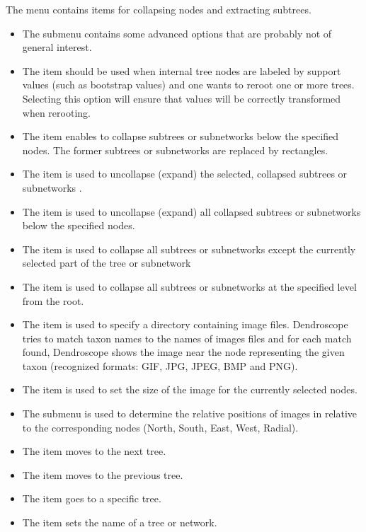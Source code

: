 \documentclass[11pt]{article}
\newcommand{\cs}[1]{\textcolor{red}{#1}}
\begin{document}
The  menu contains items for collapsing nodes and extracting subtrees.
\begin{itemize}
\item The  submenu contains some advanced options that are probably not
of general interest.
\item The  item
should be used when internal tree nodes are labeled by support values (such as bootstrap values) and one wants to reroot one or more trees.
Selecting this option will ensure that values will be correctly transformed
when rerooting. 
\item The  item enables to collapse subtrees or subnetworks below the  specified nodes. The former subtrees or subnetworks  are replaced by rectangles.
\item The  item is used to uncollapse (expand) the selected, collapsed subtrees or  subnetworks .
\item The  item is used to uncollapse (expand) all collapsed subtrees or subnetworks below  the  specified nodes.
\item The  item is used to collapse all subtrees or  subnetworks except the currently selected part of the tree or  subnetwork%
\item The  item is used to collapse all subtrees or  subnetworks at the specified level from the root. 
\item The  item is used to specify a directory containing
image files. Dendroscope tries to match taxon names to the names of images files and for each match
found, Dendroscope shows the image near the node representing the given taxon (recognized formats: GIF, JPG, JPEG, BMP and PNG). %
\item The  item is used to set the size of the image for the currently selected
nodes.
\item The  submenu is used to determine the relative positions of images
in relative to the corresponding nodes (North, South, East, West, Radial).%
\item The  item moves to the next tree.
\item The  item moves to the previous tree.
\item The  item goes to a specific tree.
\item The  item sets the name of a tree or network.
\end{itemize}
\end{document}

